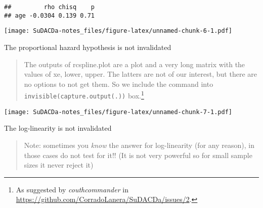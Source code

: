 \documentclass[]{book}
\newenvironment{Shaded}{\begin{snugshade}}{\end{snugshade}}
\newcommand{\KeywordTok}[1]{\textcolor[rgb]{0.13,0.29,0.53}{\textbf{{#1}}}}
\newcommand{\DataTypeTok}[1]{\textcolor[rgb]{0.13,0.29,0.53}{{#1}}}
\newcommand{\DecValTok}[1]{\textcolor[rgb]{0.00,0.00,0.81}{{#1}}}
\newcommand{\StringTok}[1]{\textcolor[rgb]{0.31,0.60,0.02}{{#1}}}
\newcommand{\CommentTok}[1]{\textcolor[rgb]{0.56,0.35,0.01}{\textit{{#1}}}}
\newcommand{\NormalTok}[1]{{#1}}
\let\rmarkdownfootnote\footnote%
\def\footnote{\protect\rmarkdownfootnote}
\theoremstyle{definition}
\theoremstyle{definition}
\theoremstyle{definition}
\theoremstyle{remark}
\begin{document}
\begin{verbatim}
##         rho chisq    p
## age -0.0304 0.139 0.71
\end{verbatim}

\begin{Shaded}
\end{Shaded}

\texttt{[image: SuDACDa-notes\_files/figure-latex/unnamed-chunk-6-1.pdf]}

The proportional hazard hypothesis is not invalidated

\begin{quote}
The outputs of rcspline.plot are a plot and a very long matrix with the
values of xe, lower, upper. The latters are not of our interest, but
there are no options to not get them. So we include the command into
\texttt{invisible(capture.output(.))} box.\footnote{As suggested by
  \emph{couthcommander} in
  \url{https://github.com/CorradoLanera/SuDACDa/issues/2}.}
\end{quote}

\begin{Shaded}
\end{Shaded}

\texttt{[image: SuDACDa-notes\_files/figure-latex/unnamed-chunk-7-1.pdf]}

The log-linearity is not invalidated

\begin{quote}
Note: sometimes you \emph{know} the answer for log-linearity (for any
reason), in those cases do not test for it!! (It is not very powerful so
for small sample sizes it never reject it)
\end{quote}
\end{document}
